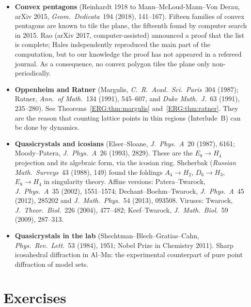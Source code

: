 \documentclass[11pt,openany]{book}
\theoremstyle{plain}
\theoremstyle{definition}
\theoremstyle{remark}
\begin{document}
\begin{itemize}[leftmargin=1.2em,itemsep=0.45em]
  Tao (\emph{Ann.\ of Math.}~200 (2024), 301--363) found a counterexample in sufficiently high dimension,
  encoding a ``Sudoku'' by a single tiling equation. So translational tilings by one tile can be forced to
  be aperiodic.
\item \textbf{Convex pentagons} (Reinhardt 1918 to Mann--McLoud-Mann--Von Derau, arXiv 2015,
  \emph{Geom.\ Dedicata}~194 (2018), 141--167). Fifteen families of
  convex pentagons are known to tile the plane, the fifteenth found by computer search in 2015. Rao (arXiv
  2017, computer-assisted) announced a proof that the list is complete; Hales independently reproduced
  the main part of the computation, but to our knowledge the proof has not appeared in a refereed journal. As a consequence, no convex polygon
  tiles the plane only non-periodically.
\item \textbf{Oppenheim and Ratner} (Margulis, \emph{C.\ R.\ Acad.\ Sci.\ Paris}~304 (1987); Ratner,
  \emph{Ann.\ of Math.}~134 (1991), 545--607, and \emph{Duke Math.\ J.}~63 (1991), 235--280). See
  Theorems~\ref{ERG:thm:margulis} and~\ref{ERG:thm:ratner}. They are the reason that counting lattice
  points in thin regions (Interlude~B) can be done by dynamics.
\item \textbf{Quasicrystals and icosians} (Elser--Sloane, \emph{J.\ Phys.\ A}~20 (1987), 6161; Moody--Patera,
  \emph{J.\ Phys.\ A}~26 (1993), 2829). These are the $E_8\to H_4$ projection and its algebraic form, via the
  icosian ring. Shcherbak (\emph{Russian Math.\ Surveys}~43 (1988), 149) found the foldings
  $A_4\to H_2$, $D_6\to H_3$, $E_8\to H_4$ in singularity theory. Affine versions: Patera--Twarock,
  \emph{J.\ Phys.\ A}~35 (2002), 1551--1574; Dechant--Boehm--Twarock, \emph{J.\ Phys.\ A}~45 (2012), 285202
  and \emph{J.\ Math.\ Phys.}~54 (2013), 093508. Viruses: Twarock, \emph{J.\ Theor.\ Biol.}~226 (2004),
  477--482; Keef--Twarock, \emph{J.\ Math.\ Biol.}~59 (2009), 287--313.
\item \textbf{Quasicrystals in the lab} (Shechtman--Blech--Gratias--Cahn, \emph{Phys.\ Rev.\ Lett.}~53 (1984),
  1951; Nobel Prize in Chemistry 2011). Sharp icosahedral diffraction in Al--Mn: the experimental
  counterpart of pure point diffraction of model sets.
\end{itemize}

\section*{Exercises}
\end{document}
